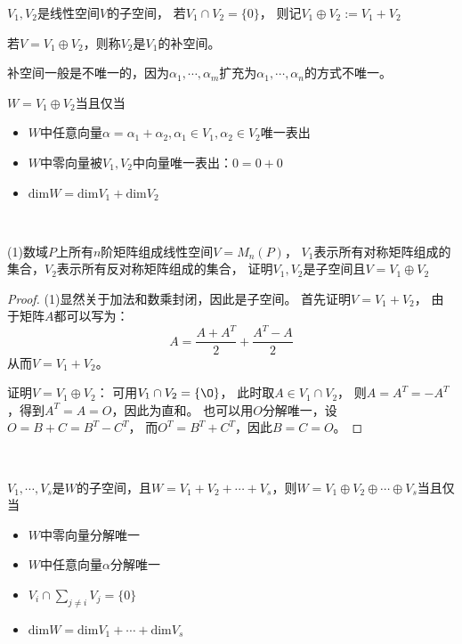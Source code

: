 \begin{definition}[直和]
  $V_1,V_2$是线性空间$V$的子空间，
  若$V_1 \cap V_2 = \{0\}$，
  则记$V_1 \oplus V_2 := V_1 + V_2$
\end{definition}

\begin{definition}[补空间]
  若$V = V_1 \oplus V_2$，则称$V_2$是$V_1$的补空间。
\end{definition}

\begin{note}
  补空间一般是不唯一的，因为$\alpha_1,\cdots,\alpha_m$扩充为$\alpha_1,\cdots,\alpha_n$的方式不唯一。
\end{note}

\begin{theorem}[直和等价条件]
  $W = V_1 \oplus V_2$当且仅当
  \begin{itemize}
  \item $W$中任意向量$\alpha = \alpha_1 + \alpha_2, \alpha_1 \in V_1, \alpha_2 \in V_2$唯一表出
  \item $W$中零向量被$V_1, V_2$中向量唯一表出：$0 = 0+ 0$
  \item $\mathrm{dim}W = \mathrm{dim}V_1 + \mathrm{dim}V_2$
  \end{itemize}
\end{theorem}

~

\begin{exercise}[判断直和]
  (1)数域$P$上所有$n$阶矩阵组成线性空间$V = M_n(P)$，
  $V_1$表示所有对称矩阵组成的集合，$V_2$表示所有反对称矩阵组成的集合，
  证明$V_1,V_2$是子空间且$V = V_1 \oplus V_2$
\end{exercise}

\begin{proof}
  (1)显然关于加法和数乘封闭，因此是子空间。
  首先证明$V = V_1 + V_2$，
  由于矩阵$A$都可以写为：
  \begin{equation*}
    A = \frac{A + A^T}{2} + \frac{A^T - A}{2}
  \end{equation*}
  从而$V = V_1 + V_2$。

  证明$V = V_1 \oplus V_2$：
  可用$V_1 \cap V_2 = \{\O\}$，
  此时取$A \in V_1 \cap V_2$，
  则$A = A^T = - A^T$，得到$A^T = A = O$，因此为直和。
  也可以用$O$分解唯一，设$O = B + C = B^T - C^T$，
  而$O^T = B^T + C^T$，因此$B = C = O$。
\end{proof}

~

\begin{theorem}[多空间直和等价条件]
  $V_1,\cdots,V_s$是$W$的子空间，且$W = V_1 + V_2 + \cdots + V_s$，则$W = V_1 \oplus V_2 \oplus \cdots \oplus V_s$当且仅当
  \begin{itemize}
  \item $W$中零向量分解唯一
  \item $W$中任意向量$\alpha$分解唯一
  \item $V_i \cap \sum\limits_{j \neq i} V_j = \{0\}$
  \item $\mathrm{dim}W = \mathrm{dim}V_1 + \cdots + \mathrm{dim}V_s$
  \end{itemize}
\end{theorem}

